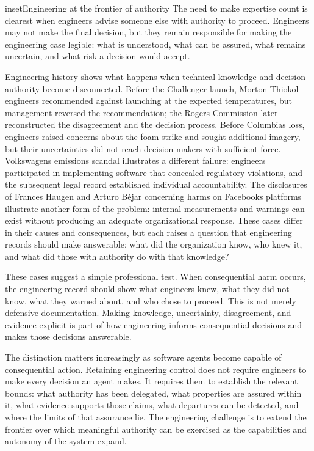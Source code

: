 \begin{bookbox}{inset}{Engineering at the frontier of authority}
\label{inset-frontier-authority}
The need to make expertise count is clearest when engineers advise someone else with authority to proceed. Engineers may not make the final decision, but they remain responsible for making the engineering case legible: what is understood, what can be assured, what remains uncertain, and what risk a decision would accept.

Engineering history shows what happens when technical knowledge and decision authority become disconnected. Before the Challenger launch, Morton Thiokol engineers recommended against launching at the expected temperatures, but management reversed the recommendation; the Rogers Commission later reconstructed the disagreement and the decision process\citep{rogers1986}. Before Columbia\textquotesingle s loss, engineers raised concerns about the foam strike and sought additional imagery, but their uncertainties did not reach decision-makers with sufficient force\citep{caib2003}. Volkswagen\textquotesingle s emissions scandal illustrates a different failure: engineers participated in implementing software that concealed regulatory violations, and the subsequent legal record established individual accountability\citep{doj-vw-liang}. The disclosures of Frances Haugen and Arturo Béjar concerning harms on Facebook\textquotesingle s platforms illustrate another form of the problem: internal measurements and warnings can exist without producing an adequate organizational response\citep{senate-haugen2021, senate-bejar2023}. These cases differ in their causes and consequences, but each raises a question that engineering records should make answerable: what did the organization know, who knew it, and what did those with authority do with that knowledge?

These cases suggest a simple professional test. When consequential harm occurs, the engineering record should show what engineers knew, what they did not know, what they warned about, and who chose to proceed. This is not merely defensive documentation. Making knowledge, uncertainty, disagreement, and evidence explicit is part of how engineering informs consequential decisions and makes those decisions answerable.

The distinction matters increasingly as software agents become capable of consequential action. Retaining engineering control does not require engineers to make every decision an agent makes. It requires them to establish the relevant bounds: what authority has been delegated, what properties are assured within it, what evidence supports those claims, what departures can be detected, and where the limits of that assurance lie. The engineering challenge is to extend the frontier over which meaningful authority can be exercised as the capabilities and autonomy of the system expand.


\end{bookbox}
